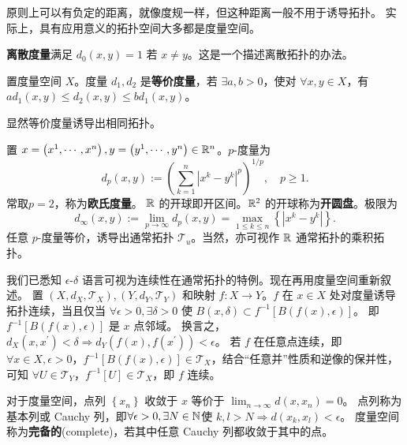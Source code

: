 \begin{remark}
    原则上可以有负定的距离，就像度规一样，但这种距离一般不用于诱导拓扑。
    实际上，具有应用意义的拓扑空间大多都是度量空间。
\end{remark}

\begin{eg}
    \textbf{离散度量}满足 $d_{0}(x,y)=1$ 若 $x \ne y$。这是一个描述离散拓扑的办法。
\end{eg}

\begin{definition}
    置度量空间 $X$。度量 $d_{1},d_{2}$ 是\textbf{等价度量}，若 $\exists a,b>0$，使对 $\forall x,y \in X$，有 $a d_{1}(x, y) \leqslant d_{2}(x, y) \leqslant b d_{1}(x, y)$。
\end{definition}

\begin{remark}
    显然等价度量诱导出相同拓扑。
\end{remark}

\begin{eg}
    置 $x=\left(x^1,\cdots,x^{n}\right),y=\left(y^{1},\cdots,y^{n}\right)\in\mathbb{R}^{n}$。$p$-度量为
\[
d_{p}(x, y):=\left(\sum_{k=1}^{n}\left|x^{k}-y^{k}\right|^{p}\right)^{1 / p},\quad p \geqslant 1.
\]
常取$p=2$，称为\textbf{欧氏度量}。
$\mathbb{R}$ 的开球即开区间。$\mathbb{R}^2$ 的开球称为\textbf{开圆盘}。极限为
\[
d_{\infty}(x,y):=\lim_{p\to\infty}d_{p}(x, y)=\max _{1 \leqslant k \leqslant n}\left\{\left|x^{k}-y^{k}\right|\right\}.
\]
任意 $p$-度量等价，诱导出通常拓扑 $\mathscr T_u$。当然，亦可视作 $\mathbb{R}$ 通常拓扑的乘积拓扑。
\end{eg}

我们已悉知 $\epsilon$-$\delta$ 语言可视为连续性在通常拓扑的特例。现在再用度量空间重新叙述。
置 $(X,d_X,\mathscr T_X),(Y,d_Y,\mathscr T_Y)$ 和映射 $f:X\to Y$。$f$ 在 $x \in X$ 处对度量诱导拓扑连续，当且仅当 $\forall\epsilon>0,\exists\delta>0$ 使 $B(x,\delta) \subset f^{-1} [B(f(x),\epsilon)]$。
即 $f^{-1} [B(f(x),\epsilon)]$ 是 $x$ 点邻域。
换言之，$d_X(x,x^{\prime})<\delta\Rightarrow d_Y(f(x),f(x^{\prime}))<\epsilon$。
若 $f$ 在任意点连续，即 $\forall x \in X,\epsilon > 0$，$f^{-1} [B(f(x),\epsilon)]\in\mathscr T_X$，结合“任意并”性质和逆像的保并性，可知 $\forall U\in\mathscr T_Y$，$f^{-1}[U]\in\mathscr T_X$，即 $f$ 连续。

对于度量空间，点列 $\left\{x_n\right\}$ 收敛于 $x$ 等价于 $\lim_{n\to\infty}d(x, x_n)=0$。
点列称为基本列或 Cauchy 列，即$\forall\epsilon>0,\exists N\in\mathbb{N}$使 $k,l>N\Rightarrow d(x_{k},x_{l})<\epsilon$。
度量空间称为\textbf{完备的}(complete)，若其中任意 Cauchy 列都收敛于其中的点。

